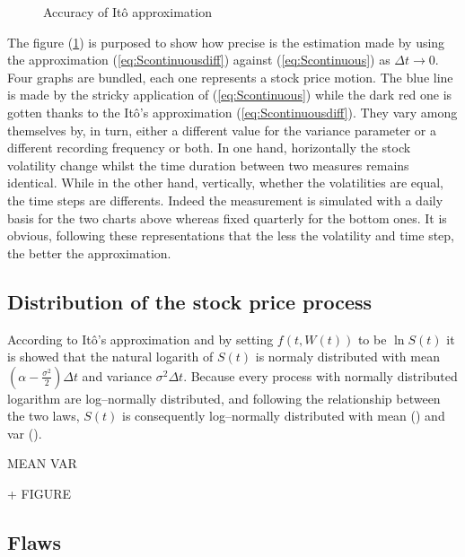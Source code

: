 \documentclass[12pt]{report}
\newcommand{\Bm}{W\left(t\right)}
\newcommand{\Dt}{\Delta t}
\newcommand{\ft}{f\left(t, \Bm \right)}
\newcommand{\St}{S\left(t\right)}
\begin{document}
\begin{figure}[h]
\centering

\caption{Accuracy of Itô approximation}
\label{plot:ItoAccuracy}
\end{figure}


The figure (\ref{plot:ItoAccuracy}) is purposed to show how precise is the estimation made by using the approximation (\ref{eq:Scontinuousdiff}) against (\ref{eq:Scontinuous}) as $\Dt \to 0$.
Four graphs are bundled, each one represents a stock price motion. The blue line is made by the stricky application of (\ref{eq:Scontinuous}) while the dark red one is gotten thanks to the Itô's approximation (\ref{eq:Scontinuousdiff}).
They vary among themselves by, in turn, either a different value for the variance parameter or a different recording frequency or both.
In one hand, horizontally the stock volatility change whilst the time duration between two measures remains identical. 
While in the other hand, vertically, whether the volatilities are equal, the time steps are differents. Indeed the measurement is simulated with a daily basis for the two charts above whereas fixed quarterly for the bottom ones.
It is obvious, following these representations that the less the volatility and time step, the better the approximation. 

\subsection{Distribution of the stock price process}
\label{sub:Distribution of the stock price process}

According to Itô's approximation and by setting $\ft$ to be $\ln{\St}$ it is showed that the natural logarith of $\St$ is normaly distributed with mean
$\left(\alpha - \frac{\sigma^2}{2}\right) \Dt$ and variance $\sigma^2 \Dt$.
Because every process with normally distributed logarithm are log--normally distributed, and following the relationship between the two laws, $\St$ is consequently log--normally distributed with mean () and var ().

MEAN
VAR


+ FIGURE
\subsection{Flaws}
\label{sub:Flaws}
\end{document}
